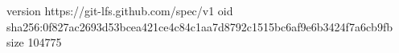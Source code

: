 version https://git-lfs.github.com/spec/v1
oid sha256:0f827ac2693d53bcea421ce4c84c1aa7d8792c1515bc6af9e6b3424f7a6cb9fb
size 104775
